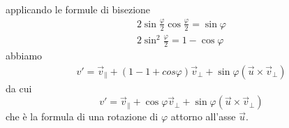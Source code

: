 \documentclass[a4paper,11pt]{article}
\begin{document}
applicando le formule di bisezione
\begin{eqnarray*}
	2 \sin \frac{\varphi}{2} \cos \frac{\varphi}{2} = \sin \varphi
\\
	2 \sin^2 \frac{\varphi}{2} = 1 - \cos \varphi
\end{eqnarray*}
abbiamo
\begin{eqnarray*}
	v' = \vec v_\parallel + (1 - 1 + cos \varphi) \vec v_\perp + \sin \varphi (\vec u \times \vec v_\perp) 
\end{eqnarray*}
da cui
\begin{equation}
	\label{eq:rotate}
	v' = \vec v_\parallel + \cos \varphi \vec v_\perp + \sin \varphi (\vec u \times \vec v_\perp) 
\end{equation}
che è la formula di una rotazione di $\varphi$ attorno all'asse $\vec u$.
\end{document}

